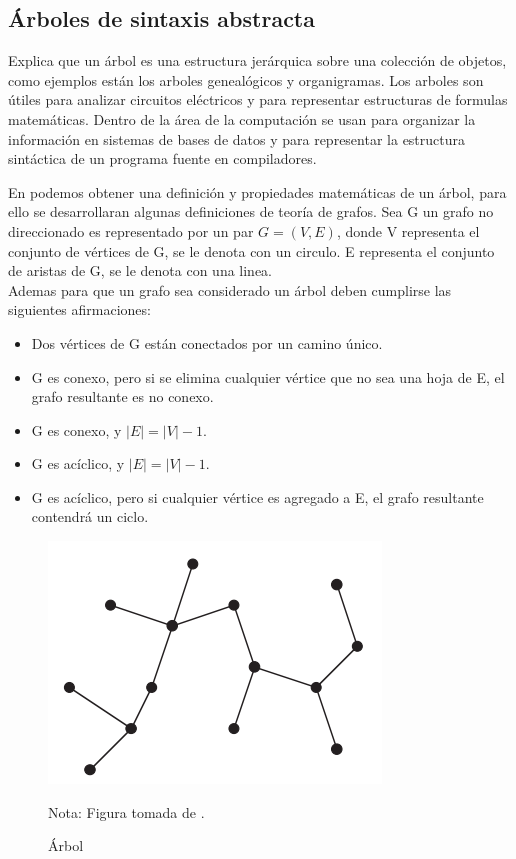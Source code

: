 \subsection{Árboles de sintaxis abstracta}
\cite{Aho1999} Explica que un árbol es una estructura jerárquica sobre una colección de objetos, como ejemplos están los arboles genealógicos y organigramas. Los arboles son útiles para analizar circuitos eléctricos y para representar estructuras de formulas matemáticas. Dentro de la área de la computación se usan para organizar la información en sistemas de bases de datos y para representar la estructura sintáctica de un programa fuente en compiladores.

En \cite{Cormen2009} podemos obtener una definición y propiedades matemáticas de un árbol, para ello se desarrollaran algunas definiciones de teoría de grafos. Sea G un grafo no direccionado es representado por un par $G=(V,E)$, donde V representa el conjunto de vértices de G, se le denota con un circulo. E representa el conjunto de aristas de G, se le denota con una linea.\\
Ademas para que un grafo sea considerado un árbol deben cumplirse las siguientes afirmaciones:
\begin{itemize}
    \item Dos vértices de G están conectados por un camino único.
    \item G es conexo, pero si se elimina cualquier vértice que no sea una hoja de E, el grafo resultante es no conexo.
    \item G es conexo, y $|E| = |V|-1$.
    \item G es acíclico, y $|E| = |V|-1$.
    \item G es acíclico, pero si cualquier vértice es agregado a E, el grafo resultante contendrá un ciclo.
\end{itemize}
\begin{figure}[h!]
\centering
\includegraphics[scale=0.8]{imagenes/arbol1}
\caption{Árbol}
Nota: Figura tomada de \cite{Cormen2009}.
\label{arbol1}
\end{figure}

